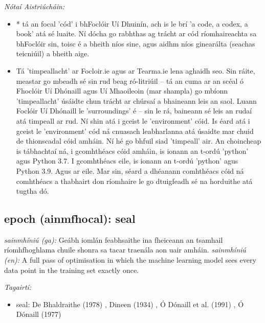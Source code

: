\documentclass{article}
\begin{document}
 \noindent \textit{Nótaí Aistriúcháin:}
\begin{itemize}
	\item * tá an focal 'cód' i bhFoclóir Uí Dhuinín, ach is le brí 'a code, a codex, a book' atá sé luaite. Ní dócha go rabhthas ag trácht ar cód ríomhaireachta sa bhFoclóir sin, toisc é a bheith níos sine, agus aidhm níos ginearálta (seachas teicniúil) a bheith aige.
	\item Tá 'timpeallacht' ar Focloir.ie agus ar Tearma.ie lena aghaidh seo. Sin ráite, meastar go mbeadh sé sin rud beag ró-litriúil -- tá an cuma ar an scéal ó Fhoclóir Uí Dhónaill agus Uí Mhaoileoin (mar shampla) go mbíonn 'timpeallacht' úsáidte chun trácht ar chúrsaí a bhaineann leis an saol. Luann Foclóir Uí Dhónaill le 'surroundings' é -- sin le rá, baineann sé leis an rudaí atá timpeall ar rud. Ní shin atá i gceist le 'environment' cóid. Is éard atá i gceist le 'environment' cód ná cnuasach leabharlanna atá úsaidte mar chuid de thionscadal cóid amháin. Ní hé go bhfuil siad 'timpeall' air. An choincheap is tábhachtaí ná, i gcomhthéacs cóid amháin, is ionann an t-ordú 'python' agus Python 3.7. I gcomhthéacs eile, is ionann an t-ordú 'python' agus Python 3.9. Agus ar eile. Mar sin, séard a dhéanann comhthéacs cóid ná comhthéacs a thabhairt don ríomhaire le go dtuigfeadh sé na horduithe atá tugtha dó.
\end{itemize}


\subsection*{epoch (ainmfhocal): seal} 
 \noindent \textit{sainmhíniú (ga):}  Geábh iomlán feabhsaithe ina fheiceann an tsamhail ríomhfhoghlama chuile shonra sa tacar traenála aon uair amháin.
\newline\newline
 \noindent \textit{sainmhíniú (en):} A full pass of optimisation in which the machine learning model sees every data point in the training set exactly once.
\newline

 \noindent \textit{Tagairtí:}
\begin{itemize}
	\item seal: De Bhaldraithe (1978) \cite{de-bhaldraithe}, Dineen (1934) \cite{dineen}, Ó Dónaill et al. (1991) \cite{focloir-beag}, Ó Dónaill (1977) \cite{odonaill}
\end{itemize}
\end{document}
